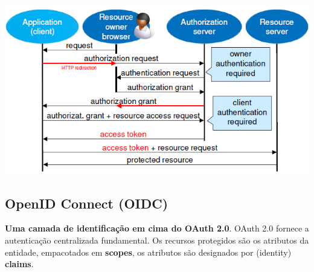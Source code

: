 \documentclass{article}
\begin{document}
\begin{center}
  \includegraphics[scale=0.6]{29}
\end{center}

\subsection{OpenID Connect (OIDC)}

\begin{flushleft}
  \textbf{Uma camada de identificação em cima do OAuth 2.0}.
  OAuth 2.0 fornece a autenticação centralizada fundamental.
  Os recursos protegidos são os atributos da entidade,
  empacotados em \textbf{scopes}, os atributos são designados
  por (identity) \textbf{claims}.
\end{flushleft}
\end{document}

